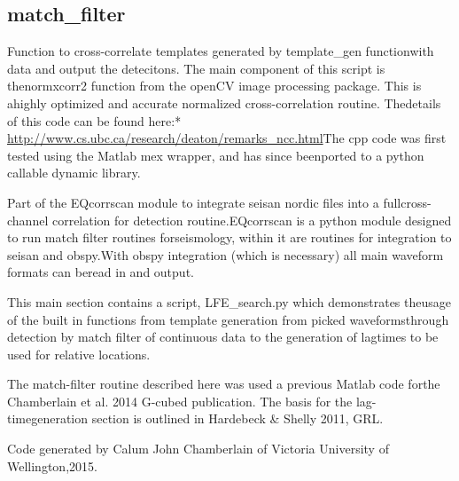 \documentclass[a4paper,10pt,english]{sphinxmanual}
\begin{document}
\subsection{match\_filter}
\label{submodules/core.match_filter::doc}\label{submodules/core.match_filter:match-filter}\label{submodules/core.match_filter:module-match_filter}
Function to cross-correlate templates generated by template\_gen functionwith data and output the detecitons.  The main component of this script is thenormxcorr2 function from the openCV image processing package.  This is ahighly optimized and accurate normalized cross-correlation routine.  Thedetails of this code can be found here:* \href{http://www.cs.ubc.ca/research/deaton/remarks\_ncc.html}{http://www.cs.ubc.ca/research/deaton/remarks\_ncc.html}The cpp code was first tested using the Matlab mex wrapper, and has since beenported to a python callable dynamic library.

Part of the EQcorrscan module to integrate seisan nordic files into a fullcross-channel correlation for detection routine.EQcorrscan is a python module designed to run match filter routines forseismology, within it are routines for integration to seisan and obspy.With obspy integration (which is necessary) all main waveform formats can beread in and output.

This main section contains a script, LFE\_search.py which demonstrates theusage of the built in functions from template generation from picked waveformsthrough detection by match filter of continuous data to the generation of lagtimes to be used for relative locations.

The match-filter routine described here was used a previous Matlab code forthe Chamberlain et al. 2014 G-cubed publication.  The basis for the lag-timegeneration section is outlined in Hardebeck \& Shelly 2011, GRL.

Code generated by Calum John Chamberlain of Victoria University of Wellington,2015.
\end{document}
